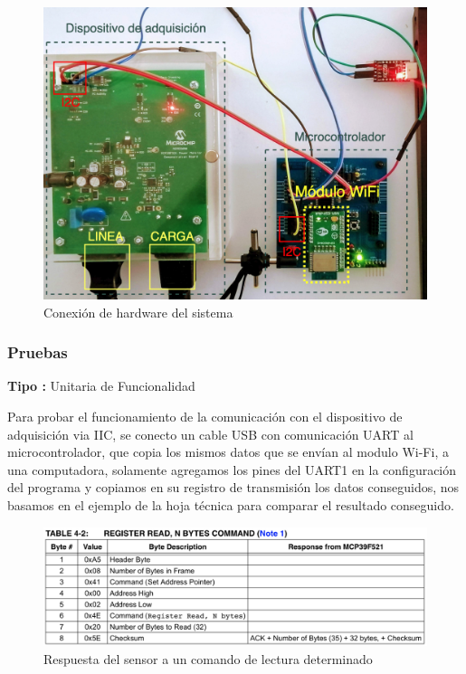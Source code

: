 \begin{figure}[H]
	\centering
	\includegraphics[scale=.3]{Capitulo5/images/conexion_fisica.png}
	\caption{Conexión de hardware del sistema}
	\label{fig:conexion hardware}
\end{figure} 

\subsubsection{Pruebas}
\textbf{Tipo :} Unitaria de Funcionalidad \\ \newline

Para probar el funcionamiento de la comunicación con el dispositivo de adquisición via IIC, se conecto un cable USB con comunicación UART al microcontrolador, que copia los mismos datos que se envían al modulo Wi-Fi, a una computadora, solamente agregamos los pines del UART1 en la configuración del programa y copiamos en su registro de transmisión los datos conseguidos, nos basamos en el ejemplo de la hoja técnica para comparar el resultado conseguido.

\begin{figure}[H]
	\centering
	\includegraphics[scale=.3]{Capitulo5/images/respuesta_sensor.png}
	\caption{Respuesta del sensor a un comando de lectura determinado}
	\label{fig:respuesta sensor}
\end{figure} 

